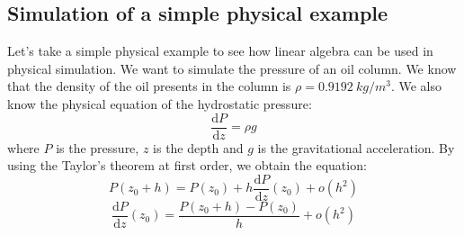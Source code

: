 \subsection{Simulation of a simple physical example}
Let's take a simple physical example to see how linear algebra can be used in physical simulation.
%
We want to simulate the pressure of an oil column.
%
We know that the density of the oil presents in the column is $\rho = 0.9192~kg/m^3$.
%
We also know the physical equation of the hydrostatic pressure:
%
\begin{equation}
\label{eq:hydrostatic}
\frac{\mathrm d P}{\mathrm d z} = \rho{}g
\end{equation}
%
where $P$ is the pressure, $z$ is the depth and $g$ is the gravitational acceleration.
%
By using the Taylor's theorem at first order, we obtain the equation:
%
\begin{equation}
P(z_0+h) = P(z_0) + h \frac{\mathrm d P}{\mathrm d z} (z_0) + o(h^2)
\end{equation}
\begin{equation}
\frac{\mathrm d P}{\mathrm d z} (z_0) = \frac{P(z_0+h) - P(z_0)}{h} + o(h^2)
\end{equation}

